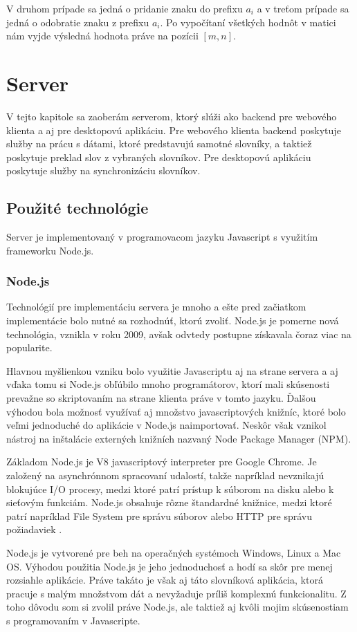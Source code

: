 \documentclass[
  digital, %
  table,   %
  lof,     %
  lot,     %
]{fithesis3}
\begin{document}
V druhom prípade sa jedná o pridanie znaku do prefixu $a_i$ a v treťom prípade sa jedná o odobratie znaku z prefixu $a_i$. Po vypočítaní všetkých hodnôt v matici nám vyjde výsledná hodnota práve na pozícii $[m,n]$.



\chapter{Server}
V tejto kapitole sa zaoberám serverom, ktorý slúži ako backend pre webového klienta a aj pre desktopovú aplikáciu. Pre webového klienta backend poskytuje služby na prácu s dátami, ktoré predstavujú samotné slovníky, a taktiež poskytuje preklad slov z vybraných slovníkov. Pre desktopovú aplikáciu poskytuje služby na synchronizáciu slovníkov.

\section{Použité technológie}
Server je implementovaný v programovacom jazyku Javascript s využitím frameworku Node.js.

\subsection{Node.js}
Technológií pre implementáciu servera je mnoho a ešte pred začiatkom implementácie bolo nutné sa rozhodnúť, ktorú zvoliť. Node.js je pomerne nová technológia, vznikla v roku 2009, avšak odvtedy postupne získavala čoraz viac na popularite.

Hlavnou myšlienkou vzniku bolo využitie Javascriptu aj na strane servera a aj vďaka tomu si Node.js obľúbilo mnoho programátorov, ktorí mali skúsenosti prevažne so skriptovaním na strane klienta práve v tomto jazyku. Ďalšou výhodou bola možnosť využívať aj množstvo javascriptových knižníc, ktoré bolo veľmi jednoduché do aplikácie v Node.js naimportovať. Neskôr však vznikol nástroj na inštalácie externých knižních nazvaný Node Package Manager (NPM).

Základom Node.js je V8 javascriptový interpreter pre Google Chrome. Je založený na asynchrónnom spracovaní udalostí, takže napríklad nevznikajú blokujúce I/O procesy, medzi ktoré patrí prístup k súborom na disku alebo k sieťovým funkciám. Node.js obsahuje rôzne štandardné knižnice, medzi ktoré patrí napríklad File System pre správu súborov alebo HTTP pre správu požiadaviek \parencite{krause2017introduction}.

Node.js je vytvorené pre beh na operačných systémoch Windows, Linux a Mac OS. Výhodou použitia Node.js je jeho jednoduchosť a hodí sa skôr pre menej rozsiahle aplikácie. Práve takáto je však aj táto slovníková aplikácia, ktorá pracuje s malým množstvom dát a nevyžaduje príliš komplexnú funkcionalitu. Z toho dôvodu som si zvolil práve Node.js, ale taktiež aj kvôli mojim skúsenostiam s programovaním v Javascripte.
\end{document}
